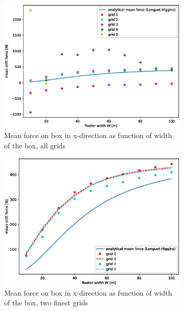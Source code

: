 \begin{figure}[H]
    \centering
    \hfill
    \begin{subfigure}[b]{0.49\textwidth}  
        \centering 
        \includegraphics[width=\textwidth]{figures/Validation/forces_with_all_grids.eps}
          \caption[]%
        {{\small}Mean force on box in x-direction as function of width of the box, all grids} 
        \label{fig:meanforceanalyticalcomparison all grids}
    \end{subfigure}
    \hfill
    \begin{subfigure}[b]{0.49\textwidth}
        \centering
        \includegraphics[width=\textwidth]{figures/Validation/forces_with_two_grids_inc_semi_analytical_eps.eps}
        \caption[]%
        {{\small}Mean force on box in x-direction as function of width of the box, two finest grids}    
        \label{fig:meanforceanalyticalcomparison two grids}
    \end{subfigure}
    
    \caption{}
    \label{}
\end{figure}


